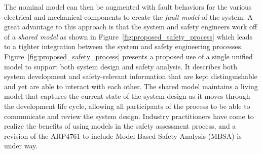 The nominal model can then be augmented with fault behaviors for the various electrical and mechanical components to create the \emph{fault model} of the system. A great advantage to this approach is that the system and safety engineers work off of a \emph{shared model} as shown in Figure~\ref{fig:proposed_safety_process} which leads to a tighter integration between the system and safety engineering processes. Figure~\ref{fig:proposed_safety_process} presents a proposed use of a single unified model to support both system design and safety analysis. It describes both system development and safety-relevant information that are kept distinguishable and yet are able to interact with each other. The shared model maintains a living model that captures the current state of the system design as it moves through the development life cycle, allowing all participants of the process to be able to communicate and review the system design. Industry practitioners have come to realize the benefits of using models in the safety assessment process, and a revision of the ARP4761 to include Model Based Safety Analysis (MBSA) is under way. 

